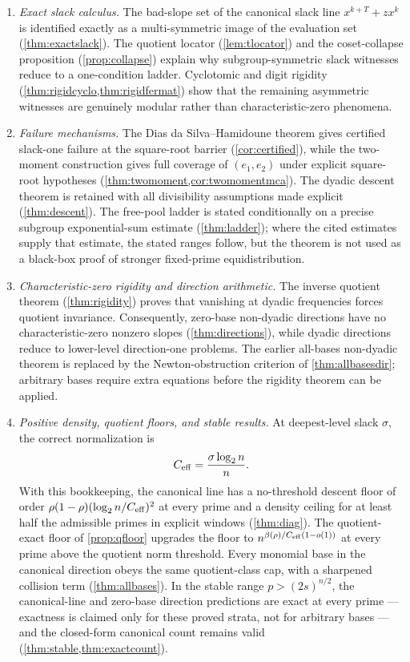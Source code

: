 \documentclass[11pt]{article}
\theoremstyle{definition}
\newcommand{\ceff}{C_{\rm eff}}
\begin{document}
\begin{enumerate}[leftmargin=2em]
\item \emph{Exact slack calculus.}  The bad-slope set of the canonical slack line $x^{k+T}+zx^k$ is identified exactly as a multi-symmetric image of the evaluation set (\cref{thm:exactslack}).  The quotient locator (\cref{lem:tlocator}) and the coset-collapse proposition (\cref{prop:collapse}) explain why subgroup-symmetric slack witnesses reduce to a one-condition ladder.  Cyclotomic and digit rigidity (\cref{thm:rigidcyclo,thm:rigidfermat}) show that the remaining asymmetric witnesses are genuinely modular rather than characteristic-zero phenomena.

\item \emph{Failure mechanisms.}  The Dias da Silva--Hamidoune theorem gives certified slack-one failure at the square-root barrier (\cref{cor:certified}), while the two-moment construction gives full coverage of $(e_1,e_2)$ under explicit square-root hypotheses (\cref{thm:twomoment,cor:twomomentmca}).  The dyadic descent theorem is retained with all divisibility assumptions made explicit (\cref{thm:descent}).  The free-pool ladder is stated conditionally on a precise subgroup exponential-sum estimate (\cref{thm:ladder}); where the cited estimates supply that estimate, the stated ranges follow, but the theorem is not used as a black-box proof of stronger fixed-prime equidistribution.

\item \emph{Characteristic-zero rigidity and direction arithmetic.}  The inverse quotient theorem (\cref{thm:rigidity}) proves that vanishing at dyadic frequencies forces quotient invariance.  Consequently, zero-base non-dyadic directions have no characteristic-zero nonzero slopes (\cref{thm:directions}), while dyadic directions reduce to lower-level direction-one problems.  The earlier all-bases non-dyadic theorem is replaced by the Newton-obstruction criterion of \cref{thm:allbasesdir}; arbitrary bases require extra equations before the rigidity theorem can be applied.

\item \emph{Positive density, quotient floors, and stable results.}  At deepest-level slack $\sigma$, the correct normalization is
\[
        \ceff=\frac{\sigma\log_2 n}{n}.
\]
With this bookkeeping, the canonical line has a no-threshold descent floor of order $\rho(1-\rho)(\log_2n/\ceff)^2$ at every prime and a density ceiling for at least half the admissible primes in explicit windows (\cref{thm:diag}).  The quotient-exact floor of \cref{prop:qfloor} upgrades the floor to $n^{\beta(\rho)/\ceff(1-o(1))}$ at every prime above the quotient norm threshold.  Every monomial base in the canonical direction obeys the same quotient-class cap, with a sharpened collision term (\cref{thm:allbases}).  In the stable range $p>(2s)^{n/2}$, the canonical-line and zero-base direction predictions are exact at every prime --- exactness is claimed only for these proved strata, not for arbitrary bases --- and the closed-form canonical count remains valid (\cref{thm:stable,thm:exactcount}).


\end{enumerate}
\end{document}
